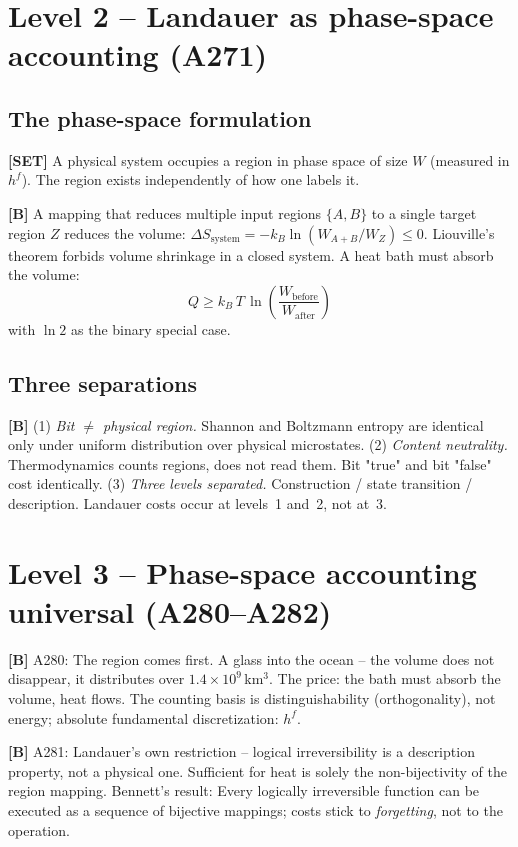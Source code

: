 \section{Level 2 -- Landauer as phase-space accounting (A271)}

\subsection{The phase-space formulation}

\textbf{[SET]} A physical system occupies a region in phase space
of size $W$ (measured in $h^f$). The region exists independently
of how one labels it.

\textbf{[B]} A mapping that reduces multiple input regions $\{A, B\}$
to a single target region $Z$ reduces the volume:
$\Delta S_\text{system} = -k_B \ln(W_{A+B}/W_Z) \le 0$.
Liouville's theorem forbids volume shrinkage in a closed system.
A heat bath must absorb the volume:
\[
\boxed{Q \ge k_B\,T\,\ln\!\left(\frac{W_\text{before}}{W_\text{after}}\right)}
\]
with $\ln 2$ as the binary special case.

\subsection{Three separations}

\textbf{[B]}
(1) \emph{Bit $\ne$ physical region.} Shannon and Boltzmann entropy
are identical only under uniform distribution over physical microstates.
(2) \emph{Content neutrality.} Thermodynamics counts regions, does not
read them. Bit "true" and bit "false" cost identically.
(3) \emph{Three levels separated.} Construction / state transition / description.
Landauer costs occur at levels~1 and~2, not at~3.

\section{Level 3 -- Phase-space accounting universal (A280--A282)}

\textbf{[B]} A280: The region comes first. A glass into the ocean --
the volume does not disappear, it distributes over
$1.4 \times 10^9$\,km$^3$. The price: the bath must absorb the volume,
heat flows. The counting basis is distinguishability
(orthogonality), not energy; absolute fundamental discretization: $h^f$.

\textbf{[B]} A281: Landauer's own restriction -- logical irreversibility
is a description property, not a physical one. Sufficient for heat
is solely the non-bijectivity of the region mapping. Bennett's result:
Every logically irreversible function can be executed as a sequence
of bijective mappings; costs stick to \emph{forgetting}, not to the
operation.

